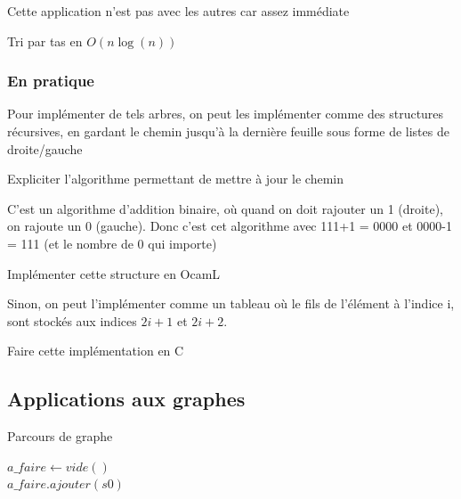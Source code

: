 \begin{com}
	Cette application n'est pas avec les autres car assez immédiate
\end{com}

\begin{appl}
	Tri par tas en $O(n \log(n))$
\end{appl}

\subsubsection{En pratique}

\begin{idee} 
	Pour implémenter de tels arbres, on peut les implémenter comme des structures récursives, en gardant le chemin jusqu'à la dernière feuille sous forme de listes de droite/gauche
\end{idee}

\begin{exercise}
	Expliciter l'algorithme permettant de mettre à jour le chemin
\end{exercise}

\begin{com}
	C'est un algorithme d'addition binaire, où quand on doit rajouter un 1 (droite), on rajoute un 0 (gauche). Donc c'est cet algorithme avec 111+1 = 0000 et 0000-1 = 111 (et le nombre de 0 qui importe)
\end{com}

\begin{exercise}
	Implémenter cette structure en OcamL
\end{exercise}

\begin{idee}
	Sinon, on peut l'implémenter comme un tableau où le fils de l'élément à l'indice i, sont stockés aux indices $2i+1$ et $2i+2$.
\end{idee}

\begin{exercise}
	Faire cette implémentation en C
\end{exercise}

\subsection{Applications aux graphes}

\begin{algorithm}[H]
	\caption{Parcours de graphe}
	$a\_faire \gets vide()$ \\
	$a\_faire.ajouter(s0)$ \\
\end{algorithm}

